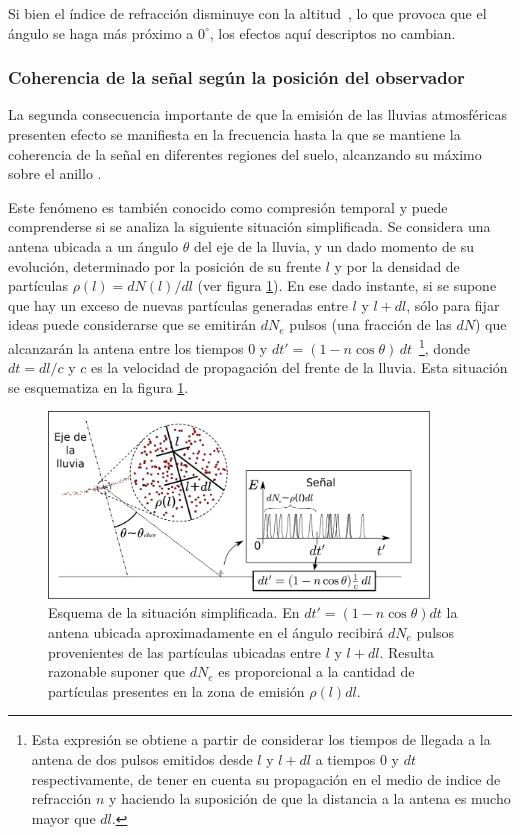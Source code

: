 	Si bien el \'indice de refracci\'on disminuye con la altitud~\cite{zhairezAir}, lo que provoca que el \'angulo \cher{} se haga m\'as pr\'oximo a $0^\circ$, los efectos aqu\'i descriptos no cambian.  
	
	\subsubsection{Coherencia de la se\~nal seg\'un la posici\'on del observador}
	
	La segunda consecuencia importante de que la emisi\'on de las lluvias atmosf\'ericas presenten efecto \cher{} se manifiesta en la frecuencia hasta la que se mantiene la coherencia de la se\~nal en diferentes regiones del suelo, alcanzando su m\'aximo sobre el anillo \cher{}.
	
	Este fen\'omeno es tambi\'en conocido como compresi\'on temporal y puede comprenderse si se analiza la siguiente situaci\'on simplificada.
	Se considera una antena ubicada a un \'angulo $\theta$ del eje de la lluvia, y un dado momento de su evoluci\'on, determinado por la posici\'on de su frente $l$ y por la densidad de part\'iculas $\rho(l)=dN(l)/dl$ (ver figura \ref{fig:coherencia_1}).
	En ese dado instante, si se supone que hay un exceso de nuevas part\'iculas generadas entre $l$ y $l+dl$, s\'olo para fijar ideas puede considerarse que se emitir\'an $dN_e$ pulsos  (una fracci\'on de las $dN$) que alcanzar\'an la antena entre los tiempos $0$ y $dt'=(1-n\cos\theta)\,dt$~\footnote{Esta expresi\'on se obtiene a partir de considerar los tiempos de llegada a la antena de dos pulsos emitidos desde $l$ y $l+dl$ a tiempos $0$ y $dt$ respectivamente, de tener en cuenta su propagaci\'on en el medio de indice de refracci\'on $n$ y haciendo la suposici\'on de que la distancia a la antena es mucho mayor que $dl$.}, donde $dt=dl/c$ y $c$ es la velocidad de propagaci\'on del frente de la lluvia.
	Esta situaci\'on se esquematiza en la figura \ref{fig:coherencia_1}.
	\begin{figure}[ht!]
		\centering
		\includegraphics[width=0.9\textwidth]{fig/EASRadio/coherencia_2}
		\caption{\label{fig:coherencia_1} Esquema de la situaci\'on simplificada. En $dt'=(1-n\cos\theta)dt$ la antena ubicada aproximadamente en el \'angulo \cher{} recibir\'a $dN_e$ pulsos provenientes de las part\'iculas ubicadas entre $l$ y $l+dl$. Resulta razonable suponer que $dN_e$ es proporcional a la cantidad de part\'iculas presentes en la zona de emisi\'on $\rho(l)dl$.}
	\end{figure}
	
